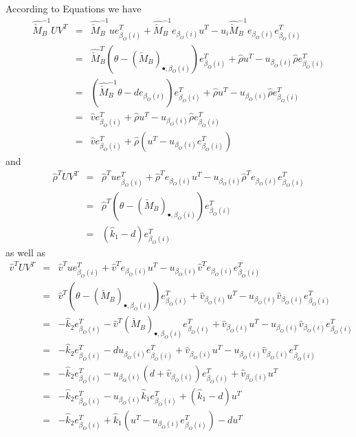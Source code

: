 \documentclass[a4paper]{article}
\begin{document}
According to Equations we have
\begin{eqnarray}
\hat{\check{M}}_{B}^{-1}UV^{T}
&=&
\hat{\check{M}}_{B}^{-1}ue_{\beta_{O}(i)}^{T}
+\hat{\check{M}}_{B}^{-1}e_{\beta_{O}(i)}u^{T}
-u_{i}\hat{\check{M}}_{B}^{-1}e_{\beta_{O}(i)}e_{\beta_{O}(i)}^{T}
\nonumber \\
&=&
\hat{\check{M}}_{B}^{T}
\left(\theta-\left(\check{M}_{B}\right)_{\bullet, \beta_{O}(i)}\right)
e_{\beta_{O}(i)}^{T}
+\hat{\rho}u^{T}
-u_{\beta_{O}(i)}\hat{\rho}e_{\beta_{O}(i)}^{T}
\nonumber \\
&=&
\left(
  \hat{\check{M}}_{B}^{-1}\theta -de_{\beta_{O}(i)}
\right)
e_{\beta_{O}(i)}^{T}
+\hat{\rho}u^{T}
-u_{\beta_{O}(i)}\hat{\rho}e_{\beta_{O}(i)}^{T}
\nonumber \\
&=&
\hat{v}e_{\beta_{O}(i)}^{T}
+\hat{\rho}u^{T}
-u_{\beta_{O}(i)}\hat{\rho}e_{\beta_{O}(i)}^{T}
\nonumber \\
&=&
\hat{v}e_{\beta_{O}(i)}^{T}
+\hat{\rho}\left(u^{T}-u_{\beta_{O}(i)}e_{\beta_{O}(i)}^{T}\right)
\end{eqnarray}
and
\begin{eqnarray}
\hat{\rho}^{T}UV^{T}
&=&
\hat{\rho}^{T}ue_{\beta_{O}(i)}^{T}
+\hat{\rho}^{T}e_{\beta_{O}(i)}u^{T}
-u_{\beta_{O}(i)}\hat{\rho}^{T}e_{\beta_{O}(i)}e_{\beta_{O}(i)}^{T}
\nonumber \\
&=&
\hat{\rho}^{T}
\left(\theta-\left(\check{M}_{B}\right)_{\bullet, \beta_{O}(i)}\right)
e_{\beta_{O}(i)}^{T}
\nonumber \\
&=&
\left(\hat{k}_{1}-d\right)e_{\beta_{O}(i)}^{T}
\end{eqnarray}
as well as
\begin{eqnarray}
\hat{v}^{T}UV^{T}
&=&
\hat{v}^{T}ue_{\beta_{O}(i)}^{T}
+\hat{v}^{T}e_{\beta_{O}(i)}u^{T}
-u_{\beta_{O}(i)}\hat{v}^{T}e_{\beta_{O}(i)}e_{\beta_{O}(i)}^{T}
\nonumber \\
&=&
\hat{v}^{T}
\left(\theta-\left(\check{M}_{B}\right)_{\bullet, \beta_{O}(i)}\right)
e_{\beta_{O}(i)}^{T}
+\hat{v}_{\beta_{O}(i)}u^{T}
-u_{\beta_{O}(i)}\hat{v}_{\beta_{O}(i)}e_{\beta_{O}(i)}^{T}
\nonumber \\
&=&
-\hat{k}_{2}e_{\beta_{O}(i)}^{T}
-\hat{v}^{T}
\left(\check{M}_{B}\right)_{\bullet, \beta_{O}(i)}e_{\beta_{O}(i)}^{T}
+\hat{v}_{\beta_{O}(i)}u^{T}
-u_{\beta_{O}(i)}\hat{v}_{\beta_{O}(i)}e_{\beta_{O}(i)}^{T}
\nonumber \\
&=&
-\hat{k}_{2}e_{\beta_{O}(i)}^{T}
-du_{\beta_{O}(i)}e_{\beta_{O}(i)}^{T}
+\hat{v}_{\beta_{O}(i)}u^{T}
-u_{\beta_{O}(i)}\hat{v}_{\beta_{O}(i)}e_{\beta_{O}(i)}^{T}
\nonumber \\
&=&
-\hat{k}_{2}e_{\beta_{O}(i)}^{T}
-u_{\beta_{O}(i)}\left(d+\hat{v}_{\beta_{O}(i)}\right)e_{\beta_{O}(i)}^{T}
+\hat{v}_{\beta_{O}(i)}u^{T}
\nonumber \\
&=&
-\hat{k}_{2}e_{\beta_{O}(i)}^{T}
-u_{\beta_{O}(i)}\hat{k}_{1}e_{\beta_{O}(i)}^{T}
+\left(\hat{k}_{1}-d\right)u^{T}
\nonumber \\
&=&
-\hat{k}_{2}e_{\beta_{O}(i)}^{T}
+\hat{k}_{1}
\left(u^{T}-u_{\beta_{O}(i)}e_{\beta_{O}(i)}^{T}\right)
-du^{T}
\end{eqnarray}
\end{document}
